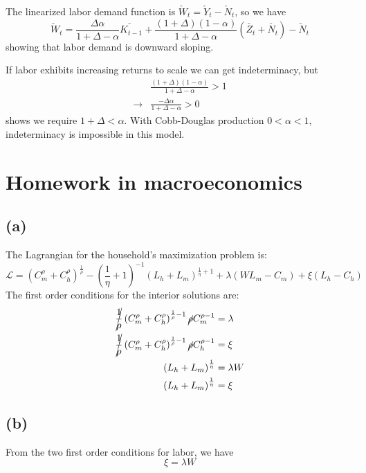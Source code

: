 \documentclass[11pt]{amsart}
\begin{document}
The linearized labor demand function is $\check W_t = \check Y_t - \check N_t$, so we have
\[
 \check W_t =  \frac{\Delta \alpha }{1 + \Delta - \alpha} \check{K_{t-1}} + \frac{(1+\Delta)(1-\alpha)}{1+ \Delta - \alpha} \left(  \check{Z_t} + \check{N_t} \right) - \check N_t 
 \]
 showing that labor demand is downward sloping.
    
If labor exhibits increasing returns to scale we can get indeterminacy, but
    \begin{align*}
    &\frac{(1+\Delta)(1-\alpha)}{1+ \Delta - \alpha} > 1  \\
    \rightarrow & \frac{-\Delta \alpha}{1 + \Delta - \alpha } > 0 
    \end{align*}
shows we require $1 + \Delta < \alpha$. 
With Cobb-Douglas production $0 < \alpha < 1$, indeterminacy is impossible in this model.  


\section{Homework in macroeconomics}

\subsection*{(a)}

 The Lagrangian for the household's maximization problem is:
\[
	\mathcal{L} = \left( C_m^\rho + C_h^\rho \right)^{\frac{1}{\rho}} - \left( \frac{1}{\eta} + 1 \right)^{-1} \left(  L_h + L_m \right)^{\frac{1}{\eta} + 1} + \lambda \left( W L_m - C_m \right) + \xi \left(L_h - C_h \right)
\]
	The first order conditions for the interior solutions are:
	\begin{align*}
	\cancel{\frac{1}{\rho}}\left( C_m^\rho + C_h^\rho \right)^{\frac{1}{\rho} -1} \cancel{\rho}  C_m^{\rho-1} &= \lambda \\
	\cancel{\frac{1}{\rho}} \left( C_m^\rho + C_h^\rho \right)^{\frac{1}{\rho} -1} \cancel{\rho} C_h^{\rho-1} & = \xi \\
	\left(  L_h + L_m \right)^{\frac{1}{\eta} }  &=\lambda W \\
	\left(  L_h + L_m \right)^{\frac{1}{\eta} }  &= \xi 	 
	\end{align*}

\subsection*{(b)}

From the two first order conditions for labor, we have 
\[
\xi = \lambda W
\]
\end{document}
